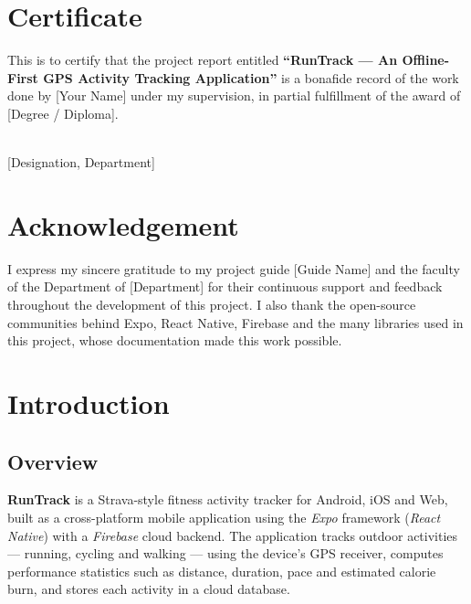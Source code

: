 \documentclass[11pt,a4paper]{report}
\begin{document}
\chapter*{Certificate}
This is to certify that the project report entitled \textbf{``RunTrack --- An Offline-First GPS Activity Tracking Application''} is a bonafide record of the work done by [Your Name] under my supervision, in partial fulfillment of the award of [Degree / Diploma].

\begin{flushright}
 \\ {[Designation, Department]}
\end{flushright}

\chapter*{Acknowledgement}
I express my sincere gratitude to my project guide [Guide Name] and the faculty of the Department of [Department] for their continuous support and feedback throughout the development of this project. I also thank the open-source communities behind Expo, React Native, Firebase and the many libraries used in this project, whose documentation made this work possible.

\tableofcontents
\listoffigures
\listoftables

\cleardoublepage
{}

\chapter{Introduction}

\section{Overview}
\textbf{RunTrack} is a Strava-style fitness activity tracker for Android, iOS and Web, built as a cross-platform mobile application using the \textit{Expo} framework (\textit{React Native}) with a \textit{Firebase} cloud backend. The application tracks outdoor activities --- running, cycling and walking --- using the device's GPS receiver, computes performance statistics such as distance, duration, pace and estimated calorie burn, and stores each activity in a cloud database.
\end{document}
